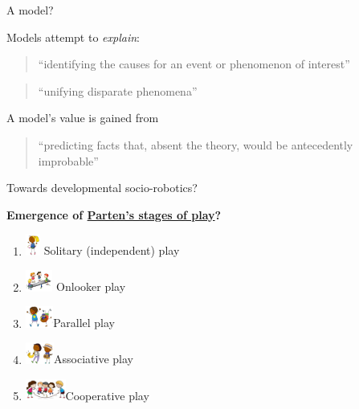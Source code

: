 \documentclass[compress]{beamer}
\begin{document}


{
\begin{frame}{A model?}

    Models attempt to \emph{explain}: 
    \begin{quote}
        ``identifying the causes for an event or phenomenon of interest''
    \end{quote}
    \begin{quote}
        ``unifying disparate phenomena''
    \end{quote}

        A model's value is gained from
    \begin{quote}
        ``predicting facts that, absent the theory, would be antecedently
        improbable''
    \end{quote}


\end{frame}
}


\begin{frame}{Towards developmental socio-robotics?}

    \Large
    {\bf Emergence of \hyperlink{parten}{Parten's stages of
            play}?}

            \small

    \begin{enumerate}
        \item \includegraphics[height=0.7cm]{figs/stagesofplay/solitary} {Solitary (independent) play}
        \item \includegraphics[height=0.7cm]{figs/stagesofplay/onlooker} {Onlooker play}
        \item \includegraphics[height=0.7cm]{figs/stagesofplay/parallel}{Parallel play}
        \item \includegraphics[height=0.7cm]{figs/stagesofplay/associative}{Associative play}
        \item \includegraphics[height=0.7cm]{figs/stagesofplay/cooperative}{Cooperative play}
    \end{enumerate}

\end{frame}
\end{document}
